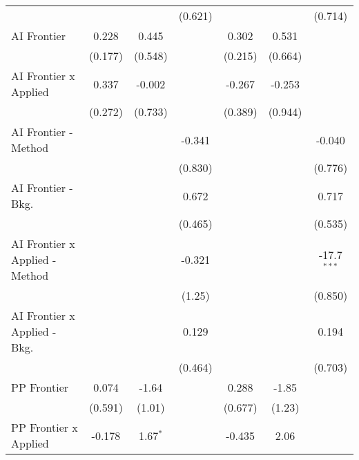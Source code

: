 \begin{tabular}{lcccccc}
                                  &               &               & (0.621)       &               &               & (0.714)\\   
   AI Frontier                    & 0.228         & 0.445         &               & 0.302         & 0.531         &   \\   
                                  & (0.177)       & (0.548)       &               & (0.215)       & (0.664)       &   \\   
   AI Frontier x Applied          & 0.337         & -0.002        &               & -0.267        & -0.253        &   \\   
                                  & (0.272)       & (0.733)       &               & (0.389)       & (0.944)       &   \\   
   AI Frontier - Method           &               &               & -0.341        &               &               & -0.040\\   
                                  &               &               & (0.830)       &               &               & (0.776)\\   
   AI Frontier - Bkg.             &               &               & 0.672         &               &               & 0.717\\   
                                  &               &               & (0.465)       &               &               & (0.535)\\   
   AI Frontier x Applied - Method &               &               & -0.321        &               &               & -17.7$^{***}$\\   
                                  &               &               & (1.25)        &               &               & (0.850)\\   
   AI Frontier x Applied - Bkg.   &               &               & 0.129         &               &               & 0.194\\   
                                  &               &               & (0.464)       &               &               & (0.703)\\   
   PP Frontier                    & 0.074         & -1.64         &               & 0.288         & -1.85         &   \\   
                                  & (0.591)       & (1.01)        &               & (0.677)       & (1.23)        &   \\   
   PP Frontier x Applied          & -0.178        & 1.67$^{*}$    &               & -0.435        & 2.06          &   \\   

\end{tabular}
